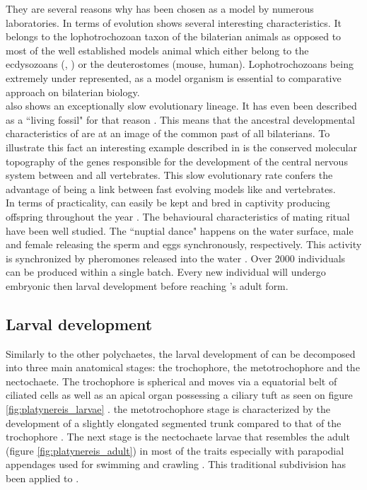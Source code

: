      They are several reasons why \platy{} has been chosen as a model by numerous laboratories. In terms of evolution \platy{} shows several interesting characteristics. It belongs to the lophotrochozoan taxon of the bilaterian animals as opposed to most of the well established models animal which either belong to the ecdysozoans (, ) or the deuterostomes (mouse, human). Lophotrochozoans being extremely under represented, \platy{} as a model organism is essential to comparative approach on bilaterian biology.\\
     
     \platy{} also shows an exceptionally slow evolutionary lineage. It has even been described as a ``living fossil" for that reason \cite{Fischer10}. This means that the ancestral developmental characteristics of \platy{} are at an image of the common past of all bilaterians. To illustrate this fact an interesting example described in \cite{denes07,tessmar07} is the conserved molecular topography of the genes responsible for the development of the central nervous system between \platy{} and all vertebrates. This slow evolutionary rate confers \platy{} the advantage of being a link between fast evolving models like  and vertebrates.\\
     
     In terms of practicality, \platy{} can easily be kept and bred in captivity producing offspring throughout the year \cite{fischer04}. The behavioural characteristics of \platy{} mating ritual have been well studied. The ``nuptial dance" happens on the water surface, male and female releasing the sperm and eggs synchronously, respectively. This activity is synchronized by pheromones released into the water \cite{zeeck98}. Over 2000 individuals can be produced within a single batch. Every new individual will undergo embryonic then larval development before reaching \platy{}'s adult form.\\

 
     \subsection{Larval development}
    Similarly to the other polychaetes, the larval development of \platy{} can be decomposed into three main anatomical stages: the trochophore, the metotrochophore and the nectochaete. The trochophore is spherical and moves via a equatorial belt of ciliated cells as well as an apical organ possessing a ciliary tuft as seen on figure \ref{fig:platynereis_larvae} \cite{rouse99,nielsen04}. the metotrochophore stage is characterized by the development of a slightly elongated segmented trunk compared to that of the trochophore \cite{hacker98}. The next stage is the nectochaete larvae that resembles the adult (figure \ref{fig:platynereis_adult}) in most of the traits especially with parapodial appendages used for swimming and crawling \cite{hacker98}. This traditional subdivision has been applied to \platy{} \cite{hauenschild69}.\\
    
